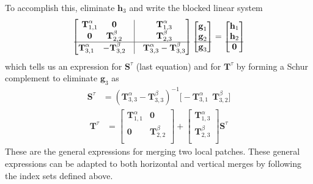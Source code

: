 To accomplish this, eliminate $\textbf{h}_3$ and write the blocked linear system
\begin{align}
    \begin{bmatrix}
        \begin{matrix}
            \textbf{T}_{1,1}^{\alpha} & \textbf{0} \\
             \textbf{0} & \textbf{T}_{2,2}^{\beta} \\
        \end{matrix}
        & \vline &
        \begin{matrix}
            \textbf{T}_{1,3}^{\alpha} \\
            \textbf{T}_{2,3}^{\beta} \\
        \end{matrix} \\
        \hline
        \begin{matrix}
            \textbf{T}_{3,1}^{\alpha} & - \textbf{T}_{3,2}^{\beta}
        \end{matrix}
        & \vline &
        \begin{matrix}
            \textbf{T}_{3,3}^{\alpha} - \textbf{T}_{3,3}^{\beta}
        \end{matrix}
    \end{bmatrix}
    \begin{bmatrix}
        \textbf{g}_1 \\
        \textbf{g}_2 \\
        \hline
        \textbf{g}_3
    \end{bmatrix} =
    \begin{bmatrix}
        \textbf{h}_1 \\
        \textbf{h}_2 \\
        \hline
        \textbf{0} \\
    \end{bmatrix}
\end{align}
which tells us an expression for $\textbf{S}^{\tau}$ (last equation) and for $\textbf{T}^{\tau}$ by forming a Schur complement to eliminate $\textbf{g}_3$ as
\begin{align}
    \textbf{S}^{\tau} &= (\textbf{T}^{\alpha}_{3,3} - \textbf{T}^{\beta}_{3,3})^{-1} \big[ -\textbf{T}^{\alpha}_{3,1} \ \ \textbf{T}^{\beta}_{3,2} \big]
    \label{merge_S}
\end{align}
\begin{align}
    \textbf{T}^{\tau} &=
    \begin{bmatrix}
        \textbf{T}^{\alpha}_{1,1} & \textbf{0} \\
        \textbf{0} & \textbf{T}^{\beta}_{2,2} \\
    \end{bmatrix} +
    \begin{bmatrix}
        \textbf{T}^{\alpha}_{1,3} \\
        \textbf{T}^{\beta}_{2,3} \\
    \end{bmatrix}
    \textbf{S}^{\tau}
    \label{merge_T}
\end{align}
These are the general expressions for merging two local patches. These general expressions can be adapted to both horizontal and vertical merges by following the index sets defined above.

